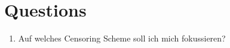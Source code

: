 \section{Questions}

\begin{enumerate}
    \item Auf welches Censoring Scheme soll ich mich fokussieren?
\end{enumerate}